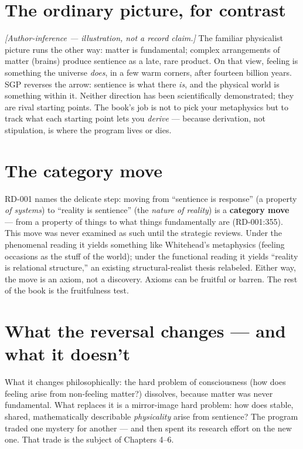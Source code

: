 \documentclass[
  11pt,
]{book}
\begin{document}
\section{The ordinary picture, for
contrast}\label{the-ordinary-picture-for-contrast}

\emph{{[}Author-inference --- illustration, not a record claim.{]}} The
familiar physicalist picture runs the other way: matter is fundamental;
complex arrangements of matter (brains) produce sentience as a late,
rare product. On that view, feeling is something the universe
\emph{does}, in a few warm corners, after fourteen billion years. SGP
reverses the arrow: sentience is what there \emph{is}, and the physical
world is something within it. Neither direction has been scientifically
demonstrated; they are rival starting points. The book's job is not to
pick your metaphysics but to track what each starting point lets you
\emph{derive} --- because derivation, not stipulation, is where the
program lives or dies.

\section{The category move}\label{the-category-move}

RD-001 names the delicate step: moving from ``sentience is response'' (a
property \emph{of systems}) to ``reality is sentience'' (the
\emph{nature of reality}) is a \textbf{category move} --- from a
property of things to what things fundamentally are (RD-001:355). This
move was never examined as such until the strategic reviews. Under the
phenomenal reading it yields something like Whitehead's metaphysics
(feeling occasions as the stuff of the world); under the functional
reading it yields ``reality is relational structure,'' an existing
structural-realist thesis relabeled. Either way, the move is an axiom,
not a discovery. Axioms can be fruitful or barren. The rest of the book
is the fruitfulness test.

\section{What the reversal changes --- and what it
doesn't}\label{what-the-reversal-changes-and-what-it-doesnt}

What it changes philosophically: the hard problem of consciousness (how
does feeling arise from non-feeling matter?) dissolves, because matter
was never fundamental. What replaces it is a mirror-image hard problem:
how does stable, shared, mathematically describable \emph{physicality}
arise from sentience? The program traded one mystery for another --- and
then spent its research effort on the new one. That trade is the subject
of Chapters 4--6.
\end{document}
